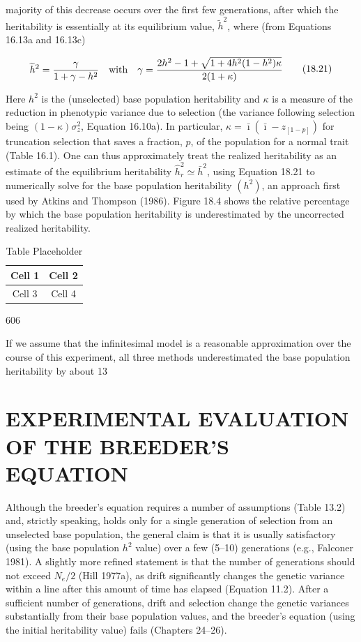 \documentclass{article}
\begin{document}
majority of this decrease occurs over the first few generations, after which the heritability is essentially at its equilibrium value,  $ \widetilde{h}^{2} $, where (from Equations 16.13a and 16.13c)

\begin{equation}
\begin{align*}\widetilde h^2=\frac{\gamma}{1+\gamma-h^2}\quad{\rm with}\quad\gamma=\frac{2h^2-1+\sqrt{1+4h^2(1-h^2)\kappa}}{2(1+\kappa)}\end{align*}
\tag{18.21}
\label{eq:18_21}
\end{equation}

Here  $ h^2 $ is the (unselected) base population heritability and  $ \kappa $ is a measure of the reduction in phenotypic variance due to selection (the variance following selection being  $ (1 - \kappa)\sigma_z^2 $, Equation 16.10a). In particular,  $ \kappa = \bar{\imath}\left(\bar{\imath} - z_{[1-p]}\right) $ for truncation selection that saves a fraction,  $ p $, of the population for a normal trait (Table 16.1). One can thus approximately treat the realized heritability as an estimate of the equilibrium heritability  $ \hat{h}_r^2 \simeq \bar{h}^2 $, using Equation 18.21 to numerically solve for the base population heritability  $ (h^2) $, an approach first used by Atkins and Thompson (1986). Figure 18.4 shows the relative percentage by which the base population heritability is underestimated by the uncorrected realized heritability.

\begin{table}[h]
\centering
\begin{tabular}{|c|c|}
\hline
Cell 1 & Cell 2 \\
\hline
Cell 3 & Cell 4 \\
\hline
\end{tabular}
\caption{Table Placeholder}
\end{table}

606

If we assume that the infinitesimal model is a reasonable approximation over the course of this experiment, all three methods underestimated the base population heritability by about 13%

\section{EXPERIMENTAL EVALUATION OF THE BREEDER'S EQUATION}
Although the breeder’s equation requires a number of assumptions (Table 13.2) and, strictly speaking, holds only for a single generation of selection from an unselected base population, the general claim is that it is usually satisfactory (using the base population  $ h^{2} $ value) over a few (5–10) generations (e.g., Falconer 1981). A slightly more refined statement is that the number of generations should not exceed  $ N_{e}/2 $ (Hill 1977a), as drift significantly changes the genetic variance within a line after this amount of time has elapsed (Equation 11.2). After a sufficient number of generations, drift and selection change the genetic variances substantially from their base population values, and the breeder’s equation (using the initial heritability value) fails (Chapters 24–26).
\end{document}
